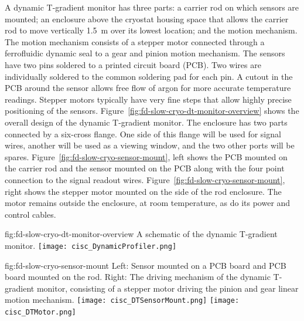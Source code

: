A dynamic T-gradient monitor has three parts: a carrier rod on which sensors are mounted; an enclosure above the cryostat housing space that allows the carrier rod to move vertically  \SI{1.5}{m} over its lowest location; and the motion mechanism. The motion mechanism consists of a stepper motor connected through a ferrofluidic dynamic seal to a gear and pinion motion mechanism. The sensors have two pins soldered to a printed circuit board (PCB). 
Two wires are individually soldered to the common soldering pad for each pin.  A cutout in the PCB around the sensor allows free flow of argon for more accurate temperature readings.  Stepper motors typically have very fine steps that allow highly precise positioning of the sensors.  Figure~\ref{fig:fd-slow-cryo-dt-monitor-overview} shows the overall design of the dynamic T-gradient monitor. %
The enclosure has two parts connected by a six-cross flange. One side of this flange will be used for signal wires, another will be used as a viewing window, and the two other ports will be spares. Figure~\ref{fig:fd-slow-cryo-sensor-mount}, left shows the PCB mounted on the carrier rod and the sensor mounted on the PCB along with the four point connection to the signal readout wires. %
Figure~\ref{fig:fd-slow-cryo-sensor-mount}, right shows the stepper motor mounted on the side of the rod enclosure. The motor remains outside the enclosure, at room temperature, %
as do its power and control cables. %

\begin{dunefigure}{fig:fd-slow-cryo-dt-monitor-overview}
  {%
  A schematic of the dynamic T-gradient monitor.}
 \texttt{[image: cisc\_DynamicProfiler.png]}
\end{dunefigure}
\begin{dunefigure}{fig:fd-slow-cryo-sensor-mount}
  {Left: Sensor mounted on a PCB board and PCB board mounted on the rod. Right:
    The driving mechanism of the dynamic T-gradient monitor, consisting of a stepper motor driving the pinion and gear linear motion mechanism. }
  \texttt{[image: cisc\_DTSensorMount.png]}
  \hspace{3cm}%
  \texttt{[image: cisc\_DTMotor.png]}
\end{dunefigure}

